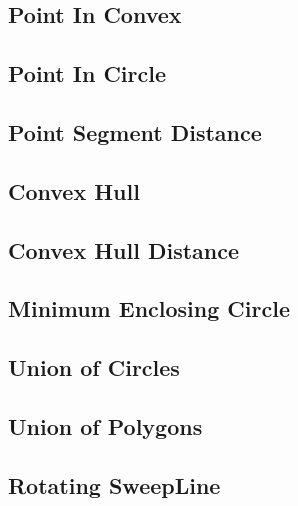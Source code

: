 \subsection{Point In Convex}
\subsection{Point In Circle}

\subsection{Point Segment Distance}

\subsection{Convex Hull}

\subsection{Convex Hull Distance}

\subsection{Minimum Enclosing Circle}

\subsection{Union of Circles}
\subsection{Union of Polygons}
% 
% 
\subsection{Rotating SweepLine}

